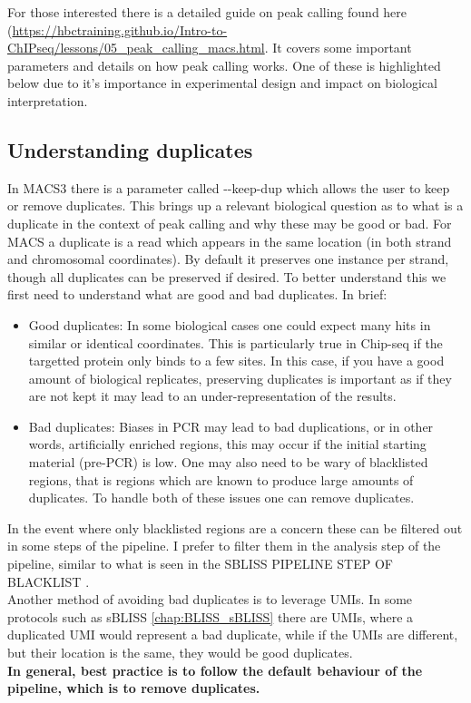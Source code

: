 For those interested there is a detailed guide on peak calling found here (\url{https://hbctraining.github.io/Intro-to-ChIPseq/lessons/05_peak_calling_macs.html}. It covers some important parameters and details on how peak calling works. One of these is highlighted below due to it's importance in experimental design and impact on biological interpretation.

\subsection{Understanding duplicates \label{subsec:MACS3_dups}}
In MACS3 there is a parameter called -{}-keep-dup which allows the user to keep or remove duplicates. This brings up a relevant biological question as to what is a duplicate in the context of peak calling and why these may be good or bad. For MACS a duplicate is a read which appears in the same location (in both strand and chromosomal coordinates). By default it preserves one instance per strand, though all duplicates can be preserved if desired. To better understand this we first need to understand what are good and bad duplicates. In brief: \\
\begin{itemize}
\item Good duplicates: In some biological cases one could expect many hits in similar or identical coordinates. This is particularly true in Chip-seq if the targetted protein only binds to a few sites. In this case, if you have a good amount of biological replicates, preserving duplicates is important as if they are not kept it may lead to an under-representation of the results.
\item Bad duplicates: Biases in PCR may lead to bad duplications, or in other words, artificially enriched regions, this may occur if the initial starting material (pre-PCR) is low. One may also need to be wary of blacklisted regions, that is regions which are known to produce large amounts of duplicates. To handle both of these issues one can remove duplicates. 
\end{itemize}
In the event where only blacklisted regions are a concern these can be filtered out in some steps of the pipeline. I prefer to filter them in the analysis step of the pipeline, similar to what is seen in the SBLISS PIPELINE STEP OF BLACKLIST .\\
Another method of avoiding bad duplicates is to leverage UMIs. In some protocols such as sBLISS \autoref{chap:BLISS_sBLISS} there are UMIs, where a duplicated UMI would represent a bad duplicate, while if the UMIs are different, but their location is the same, they would be good duplicates.\\
\textbf{In general, best practice is to follow the default behaviour of the pipeline, which is to remove duplicates.}


